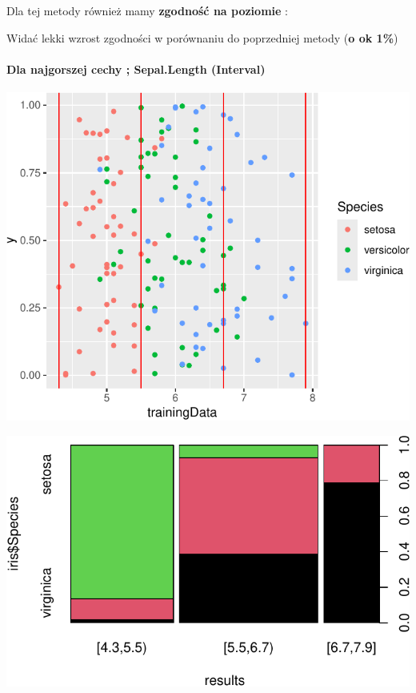 \documentclass[
  12pt,
]{article}
\begin{document}
Dla tej metody również mamy \textbf{zgodność na poziomie} :

Widać lekki wzrost zgodności w porównaniu do poprzedniej metody
(\textbf{o ok 1\%})

\paragraph{Dla najgorszej cechy ; Sepal.Length
(Interval)}\label{dla-najgorszej-cechy-sepal.length-interval}

\begin{center}\includegraphics{Sprawozdanie2_files/figure-latex/width_najg-1} \end{center}

\begin{center}\includegraphics{Sprawozdanie2_files/figure-latex/tabela_kondygnacji_2_najg-1} \end{center}
\end{document}
